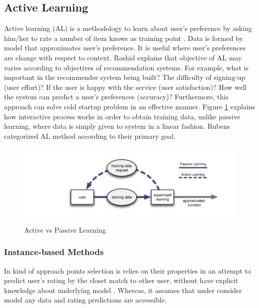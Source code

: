 \subsection{Active Learning}

Active learning (AL) is a methodology to learn about user’s preference by asking him/her to rate a number of item knows as training point \cite{ rubens2011active}. Data is formed by model that approximates user’s preference. It is useful where user’s preferences are change with respect to context.  Rashid \cite{rashid2008learning} explains that objective of AL may varies according to objectives of recommendation systems.  For example, what is important in the recommender system being built? The difficulty of signing-up (user effort)? If the user is happy with the service (user satisfaction)? How well the system can predict a user’s preferences (accuracy)? Furthermore, this approach can solve cold startup problem in an effective manner. Figure \ref{fig:ch2_active_learning} explains how interactive process works in order to obtain training data, unlike passive learning, where data is simply given to system in a linear fashion. Rubens \cite{ rubens2011active} categorized AL method according to their primary goal.  

\begin{figure}[h]
	\centering
	\includegraphics[width=1\linewidth]{figures/ch2_active_learning.png}
	\caption{Active vs Passive Learning}
	\cite{ rubens2011active}
	\label{fig:ch2_active_learning}
\end{figure}

\subsubsection{Instance-based Methods}

In kind of approach points selection is relies on their properties in an attempt to predict user’s rating by the closet match to other user, without have explicit knowledge about underlying model \cite{adomavicius2005toward}. Whereas, it assumes that under consider model any data and rating predictions are accessible.

